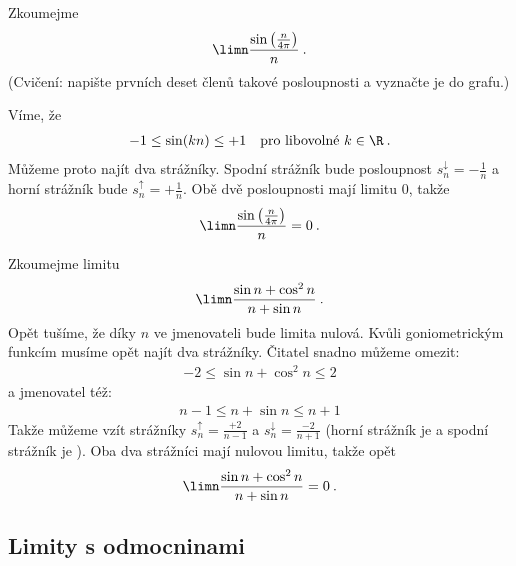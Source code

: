\begin{example}
    Zkoumejme
    \begin{align}
        \limn \frac{\sin \left( \frac{n}{4 \pi}\right)}{n} \:.
    \end{align}
    (Cvičení: napište prvních deset členů takové posloupnosti a vyznačte je do grafu.)

    Víme, že
    \begin{align}
        -1 \leq \sin (kn) \leq +1 \quad \text{pro libovolné } k \in \R \:.
    \end{align}
    Můžeme proto najít dva strážníky. Spodní strážník bude posloupnost $s_n^{\downarrow} = -\frac{1}{n}$ a horní strážník bude $s_n^{\uparrow} = + \frac{1}{n}$. Obě dvě posloupnosti mají limitu $0$, takže
    \begin{align}
        \limn \frac{\sin \left( \frac{n}{4 \pi}\right)}{n} = 0 \:.
    \end{align}
\end{example}

\begin{example}
    Zkoumejme limitu
    \begin{align}
        \limn \frac{\sin n + \cos^2 n}{n + \sin n} \:.
    \end{align}
    Opět tušíme, že díky $n$ ve jmenovateli bude limita nulová. Kvůli goniometrickým funkcím musíme opět najít dva strážníky. 
    Čitatel snadno můžeme omezit:
    \begin{align}
        -2 \leq \sin n + \cos^2 n \leq 2
    \end{align}
    a jmenovatel též:
    \begin{align}
       n-1 \leq n + \sin n \leq n + 1
    \end{align}
    Takže můžeme vzít strážníky $s_n^{\uparrow} = \frac{+2}{n - 1}$ a $s_n^{\downarrow} = \frac{-2}{n+1}$ (horní strážník je  a spodní strážník je ). Oba dva strážníci mají nulovou limitu, takže opět 
    \begin{align}
        \limn \frac{\sin n + \cos^2 n}{n + \sin n} = 0 \:.
    \end{align}
\end{example}


\subsection*{Limity s odmocninami}

